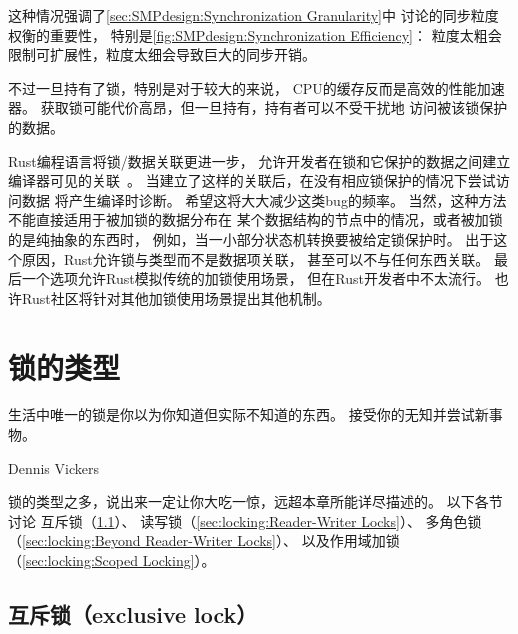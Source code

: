 这种情况强调了\cref{sec:SMPdesign:Synchronization Granularity}中
讨论的同步粒度权衡的重要性，
特别是\cref{fig:SMPdesign:Synchronization Efficiency}：
粒度太粗会限制可扩展性，粒度太细会导致巨大的同步开销。

不过一旦持有了锁，特别是对于较大的来说，
CPU的缓存反而是高效的性能加速器。
获取锁可能代价高昂，但一旦持有，持有者可以不受干扰地
访问被该锁保护的数据。

\QuickQuizEnd

Rust编程语言将锁/数据关联更进一步，
允许开发者在锁和它保护的数据之间建立编译器可见的关联~\cite{RalfJung2021RustSafeSysProg}。
当建立了这样的关联后，在没有相应锁保护的情况下尝试访问数据
将产生编译时诊断。
希望这将大大减少这类bug的频率。
当然，这种方法不能直接适用于被加锁的数据分布在
某个数据结构的节点中的情况，或者被加锁的是纯抽象的东西时，
例如，当一小部分状态机转换要被给定锁保护时。
出于这个原因，Rust允许锁与类型而不是数据项关联，
甚至可以不与任何东西关联。
最后一个选项允许Rust模拟传统的加锁使用场景，
但在Rust开发者中不太流行。
也许Rust社区将针对其他加锁使用场景提出其他机制。

\section{锁的类型}
\label{sec:locking:Types of Locks}
%
\epigraph{生活中唯一的锁是你以为你知道但实际不知道的东西。
	  接受你的无知并尝试新事物。}
	 {Dennis Vickers}

锁的类型之多，说出来一定让你大吃一惊，远超本章所能详尽描述的。
以下各节讨论
互斥锁（\cref{sec:locking:Exclusive Locks}）、
读写锁（\cref{sec:locking:Reader-Writer Locks}）、
多角色锁（\cref{sec:locking:Beyond Reader-Writer Locks}）、
以及作用域加锁（\cref{sec:locking:Scoped Locking}）。

\subsection{互斥锁（exclusive lock）}
\label{sec:locking:Exclusive Locks}

